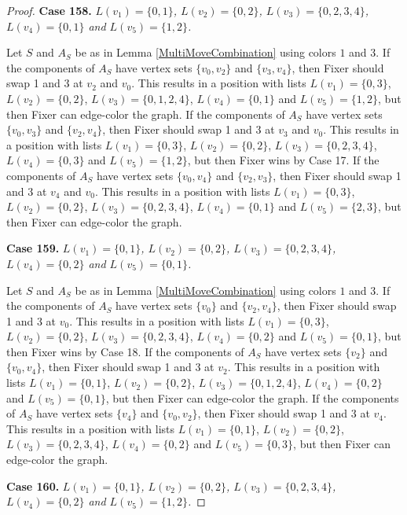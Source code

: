 \documentclass[12pt]{amsart}
\theoremstyle{plain}
\theoremstyle{definition}
\theoremstyle{remark}
\begin{document}
\begin{proof}
\noindent\textbf{Case 158.  }\textit{$L(v_1) = \{0, 1\}$, $L(v_2) = \{0, 2\}$, $L(v_3) = \{0, 2, 3, 4\}$, $L(v_4) = \{0, 1\}$ and $L(v_5) = \{1, 2\}$.}

Let $S$ and $A_S$ be as in Lemma \ref{MultiMoveCombination} using colors $1$ and $3$. If the components of $A_S$ have vertex sets $\{v_0, v_2\}$ and $\{v_3, v_4\}$, then Fixer should swap 1 and 3 at $v_2$ and $v_0$. This results in a position with lists $L(v_1) = \{0, 3\}$, $L(v_2) = \{0, 2\}$, $L(v_3) = \{0, 1, 2, 4\}$, $L(v_4) = \{0, 1\}$ and $L(v_5) = \{1, 2\}$, but then Fixer can edge-color the graph. If the components of $A_S$ have vertex sets $\{v_0, v_3\}$ and $\{v_2, v_4\}$, then Fixer should swap 1 and 3 at $v_3$ and $v_0$. This results in a position with lists $L(v_1) = \{0, 3\}$, $L(v_2) = \{0, 2\}$, $L(v_3) = \{0, 2, 3, 4\}$, $L(v_4) = \{0, 3\}$ and $L(v_5) = \{1, 2\}$, but then Fixer wins by Case 17. If the components of $A_S$ have vertex sets $\{v_0, v_4\}$ and $\{v_2, v_3\}$, then Fixer should swap 1 and 3 at $v_4$ and $v_0$. This results in a position with lists $L(v_1) = \{0, 3\}$, $L(v_2) = \{0, 2\}$, $L(v_3) = \{0, 2, 3, 4\}$, $L(v_4) = \{0, 1\}$ and $L(v_5) = \{2, 3\}$, but then Fixer can edge-color the graph. 

\noindent\textbf{Case 159.  }\textit{$L(v_1) = \{0, 1\}$, $L(v_2) = \{0, 2\}$, $L(v_3) = \{0, 2, 3, 4\}$, $L(v_4) = \{0, 2\}$ and $L(v_5) = \{0, 1\}$.}

Let $S$ and $A_S$ be as in Lemma \ref{MultiMoveCombination} using colors $1$ and $3$. If the components of $A_S$ have vertex sets $\{v_0\}$ and $\{v_2, v_4\}$, then Fixer should swap 1 and 3 at $v_0$. This results in a position with lists $L(v_1) = \{0, 3\}$, $L(v_2) = \{0, 2\}$, $L(v_3) = \{0, 2, 3, 4\}$, $L(v_4) = \{0, 2\}$ and $L(v_5) = \{0, 1\}$, but then Fixer wins by Case 18. If the components of $A_S$ have vertex sets $\{v_2\}$ and $\{v_0, v_4\}$, then Fixer should swap 1 and 3 at $v_2$. This results in a position with lists $L(v_1) = \{0, 1\}$, $L(v_2) = \{0, 2\}$, $L(v_3) = \{0, 1, 2, 4\}$, $L(v_4) = \{0, 2\}$ and $L(v_5) = \{0, 1\}$, but then Fixer can edge-color the graph. If the components of $A_S$ have vertex sets $\{v_4\}$ and $\{v_0, v_2\}$, then Fixer should swap 1 and 3 at $v_4$. This results in a position with lists $L(v_1) = \{0, 1\}$, $L(v_2) = \{0, 2\}$, $L(v_3) = \{0, 2, 3, 4\}$, $L(v_4) = \{0, 2\}$ and $L(v_5) = \{0, 3\}$, but then Fixer can edge-color the graph. 

\noindent\textbf{Case 160.  }\textit{$L(v_1) = \{0, 1\}$, $L(v_2) = \{0, 2\}$, $L(v_3) = \{0, 2, 3, 4\}$, $L(v_4) = \{0, 2\}$ and $L(v_5) = \{1, 2\}$.}


\end{proof}
\end{document}
